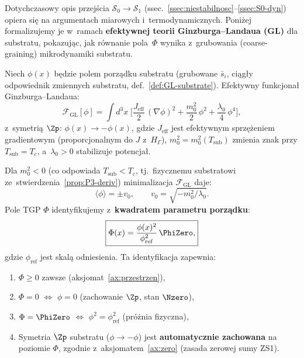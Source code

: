 Dotychczasowy opis przej\'scia $\mathcal{S}_0 \to \mathcal{S}_1$
(ssec.~\ref{ssec:niestabilnosc}--\ref{ssec:S0-dyn})
opiera si\k{e} na argumentach miarowych i~termodynamicznych.
Poni\.zej formalizujemy je w~ramach \textbf{efektywnej teorii
Ginzburga--Landaua (GL)} dla substratu, pokazuj\k{a}c, jak
r\'ownanie pola~$\Phi$ wynika z~grubowania (coarse-graining)
mikrodynamiki substratu.

\begin{definition}\label{def:GL-substrate}
Niech $\phi(x)$ b\k{e}dzie polem porz\k{a}dku substratu
(grubowane $\bar{s}_i$, ci\k{a}g\l{}y odpowiednik zmiennych
substratu, def.~\ref{def:GL-substrate}).
Efektywny funkcjona\l{} Ginzburga--Landaua:
\begin{equation}\label{eq:GL-functional}
  \boxed{
    \mathcal{F}_{\mathrm{GL}}[\phi]
    = \int d^3x\;\biggl[
      \frac{J_{\mathrm{eff}}}{2}\,(\nabla\phi)^2
      + \frac{m_0^2}{2}\,\phi^2
      + \frac{\lambda_0}{4}\,\phi^4
    \biggr],
  }
\end{equation}
z~symetri\k{a} $\Zp$: $\phi(x) \to -\phi(x)$,
gdzie $J_{\mathrm{eff}}$ jest efektywnym sprz\k{e}\.zeniem
gradientowym (proporcjonalnym do $J$ z~$H_\Gamma$),
$m_0^2 = m_0^2(T_{\mathrm{sub}})$ zmienia znak
przy $T_{\mathrm{sub}} = T_c$, a~$\lambda_0 > 0$
stabilizuje potencja\l{}.
\end{definition}

\begin{proposition}%
\label{prop:GL-breaking}
Dla $m_0^2 < 0$ (co odpowiada $T_{\mathrm{sub}} < T_c$,
tj.\ fizycznemu substratowi ze~stwierdzenia~\ref{prop:P3-deriv})
minimalizacja $\mathcal{F}_{\mathrm{GL}}$ daje:
\begin{equation}\label{eq:GL-vev}
  \langle\phi\rangle = \pm v_0, \qquad
  v_0 = \sqrt{-m_0^2/\lambda_0}.
\end{equation}
Pole TGP $\Phi$ identyfikujemy z~\textbf{kwadratem
parametru porz\k{a}dku}:
\begin{equation}\label{eq:Phi-from-phi}
  \boxed{
    \Phi(x) = \frac{\phi(x)^2}{\phi_{\mathrm{ref}}^2}\,\PhiZero,
  }
\end{equation}
gdzie $\phi_{\mathrm{ref}}$ jest skal\k{a} odniesienia.
Ta identyfikacja zapewnia:
\begin{enumerate}[nosep]
  \item $\Phi \geq 0$ zawsze (aksjomat~\ref{ax:przestrzen}),
  \item $\Phi = 0$ $\Leftrightarrow$ $\phi = 0$
    (zachowanie $\Zp$, stan $\Nzero$),
  \item $\Phi = \PhiZero$ $\Leftrightarrow$
    $\phi^2 = \phi_{\mathrm{ref}}^2$ (pr\'o\.znia fizyczna),
  \item Symetria $\Zp$ substratu ($\phi \to -\phi$)
    jest \textbf{automatycznie zachowana} na poziomie $\Phi$,
    zgodnie z~aksjomatem~\ref{ax:zero} (zasada zerowej sumy ZS1).
\end{enumerate}
\end{proposition}

